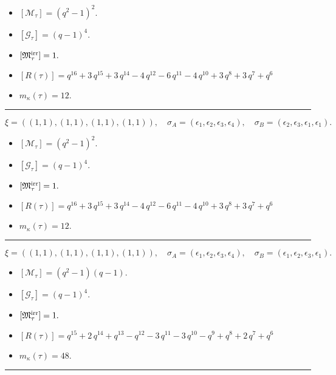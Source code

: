 \documentclass[10pt,a4paper]{amsart}
\begin{document}
\begin{itemize}
 \item $[\mathcal{M}_{\tau}] = {\left(q^{2} - 1\right)}^{2} .$

 \item $[\mathcal{G}_{\tau}] = {\left(q - 1\right)}^{4} .$

 \item $[{\frak M}_{\tau}^{\textrm{irr}}] = 1 .$

 \item $[R(\tau)] = q^{16} + 3 \, q^{15} + 3 \, q^{14} - 4 \, q^{12} - 6 \, q^{11} - 4 \, q^{10} + 3 \, q^{8} + 3 \, q^{7} + q^{6} $

 \item $m_{\kappa}(\tau) = 12 .$

 \end{itemize}
\noindent\rule{8cm}{0.4pt}

$$\xi = ({(1, 1), (1, 1)}, {(1, 1), (1, 1)}),\quad \sigma_A = ({{\epsilon_1}, {\epsilon_2}}, {{\epsilon_3}, {\epsilon_4}}),\quad \sigma_B = ({{\epsilon_2}, {\epsilon_3}}, {{\epsilon_1}, {\epsilon_1}}).$$

\begin{itemize}
 \item $[\mathcal{M}_{\tau}] = {\left(q^{2} - 1\right)}^{2} .$

 \item $[\mathcal{G}_{\tau}] = {\left(q - 1\right)}^{4} .$

 \item $[{\frak M}_{\tau}^{\textrm{irr}}] = 1 .$

 \item $[R(\tau)] = q^{16} + 3 \, q^{15} + 3 \, q^{14} - 4 \, q^{12} - 6 \, q^{11} - 4 \, q^{10} + 3 \, q^{8} + 3 \, q^{7} + q^{6} $

 \item $m_{\kappa}(\tau) = 12 .$

 \end{itemize}
\noindent\rule{8cm}{0.4pt}

$$\xi = ({(1, 1), (1, 1)}, {(1, 1), (1, 1)}),\quad \sigma_A = ({{\epsilon_1}, {\epsilon_2}}, {{\epsilon_3}, {\epsilon_4}}),\quad \sigma_B = ({{\epsilon_1}, {\epsilon_2}}, {{\epsilon_3}, {\epsilon_1}}).$$

\begin{itemize}
 \item $[\mathcal{M}_{\tau}] = {\left(q^{2} - 1\right)} {\left(q - 1\right)} .$

 \item $[\mathcal{G}_{\tau}] = {\left(q - 1\right)}^{4} .$

 \item $[{\frak M}_{\tau}^{\textrm{irr}}] = 1 .$

 \item $[R(\tau)] = q^{15} + 2 \, q^{14} + q^{13} - q^{12} - 3 \, q^{11} - 3 \, q^{10} - q^{9} + q^{8} + 2 \, q^{7} + q^{6} $

 \item $m_{\kappa}(\tau) = 48 .$

 \end{itemize}
\noindent\rule{8cm}{0.4pt}
\end{document}

